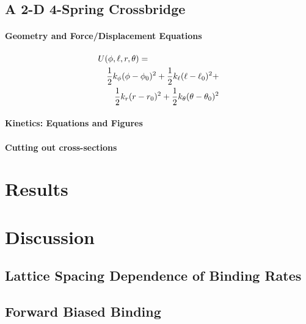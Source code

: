 \documentclass[11pt]{article}
\begin{document}
\begin{multicols}{2}
\subsection*{A 2-D 4-Spring Crossbridge}
\paragraph*{Geometry and Force/Displacement Equations}
\begin{eqnarray}
	\lefteqn{U(\phi,\ell,r,\theta) = }  \nonumber \\
 	& & \frac{1}{2}k_\phi (\phi-\phi_0)^2 + \frac{1}{2}k_\ell (\ell-\ell_0)^2 + \nonumber \\
	& & \frac{1}{2}k_r (r-r_0)^2 + \frac{1}{2}k_\theta (\theta-\theta_0)^2
\end{eqnarray}

\paragraph*{Kinetics: Equations and Figures}
\paragraph*{Cutting out cross-sections}


\section*{Results}


\section*{Discussion}

\subsection*{Lattice Spacing Dependence of Binding Rates}


\subsection*{Forward Biased Binding}


%

\end{multicols}
\end{document}
